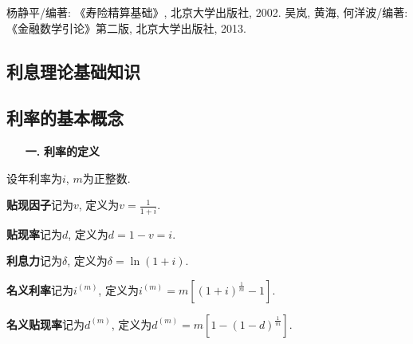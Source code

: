 \documentclass[a4paper,10pt]{ctexbook}
\newcommand{\hei}{\CJKfamily{hei}}      %
\begin{document}
\begin{thebibliography}{99}
    杨静平/编著: 《寿险精算基础》, 北京大学出版社, 2002.
     吴岚, 黄海, 何洋波/编著: 《金融数学引论》第二版, 北京大学出版社, 2013.

\end{thebibliography}

\begin{appendix}
    \chapter{利息理论基础知识}
    \section{利率的基本概念}
    \begin{itemize}
        \item[{\bf\hei 一.}]{\bf\hei 利率的定义}
    \end{itemize}

    设年利率为$i$, $m$为正整数.

    \textbf{贴现因子}记为$v$, 定义为$v=\frac{1}{1+i}$.

    \textbf{贴现率}记为$d$, 定义为$d=1-v=i$.

    \textbf{利息力}记为$\delta$, 定义为$\delta=\ln(1+i)$.

    \textbf{名义利率}记为$i^{(m)}$, 定义为$i^{(m)}=m[(1+i)^{\frac{1}{m}}-1]$.

    \textbf{名义贴现率}记为$d^{(m)}$, 定义为$d^{(m)}=m[1-(1-d)^{\frac{1}{m}}]$.
\end{appendix}
\end{document}
